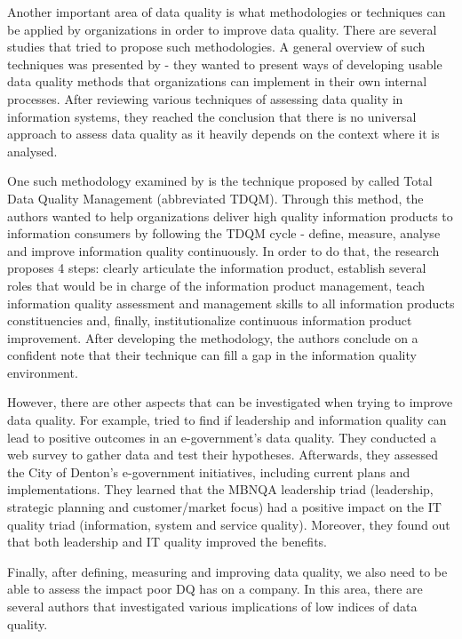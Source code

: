 \documentclass{mprop}
\begin{document}
Another important area of data quality is what methodologies or techniques can 
be applied by organizations in order to improve data quality. 
There are several studies that tried to propose such methodologies. A general 
overview of such techniques  was presented by \citet{pipino2002data} - they 
wanted to present ways of developing usable  data quality methods that 
organizations can implement in their own internal processes. After reviewing 
various techniques of assessing data quality in information systems, they reached 
the conclusion that there is no universal approach to assess data quality as it  
heavily depends on the context where it is analysed. 

One such methodology examined by \citet{pipino2002data} is the technique 
proposed by \citet{wang1998product} called Total Data Quality Management
(abbreviated TDQM). Through this method, the authors wanted to help 
organizations deliver high quality information products to information
consumers by following the TDQM cycle - define, measure, analyse and improve
information quality continuously. In order to do that, the research proposes
4 steps: clearly articulate the information product, establish several roles
that would be in charge of the information product management, teach information
quality assessment and management skills to all information products 
constituencies and, finally, institutionalize continuous information product 
improvement. After developing the methodology, the authors conclude on a 
confident note that their technique can fill a gap in the information quality
environment.

However, there are other aspects that can be investigated when trying to improve
data quality. For example, \citet{prybutok2008evaluating} tried to find if 
leadership and information quality can lead to positive outcomes in an 
e-government's data quality. They conducted a web survey to gather data and test 
their hypotheses. Afterwards, they assessed the City of Denton's e-government 
initiatives, including current plans and implementations. They learned that the 
MBNQA leadership triad (leadership, strategic planning and customer/market focus) 
had a positive impact on the IT quality triad (information, system and service 
quality). Moreover, they found out that both leadership and IT quality improved 
the benefits.

Finally, after defining, measuring and improving data quality, we also need
to be able to assess the impact poor DQ has on a company. In this area, there
are several authors that investigated various implications of low indices
of data quality.
\end{document}
